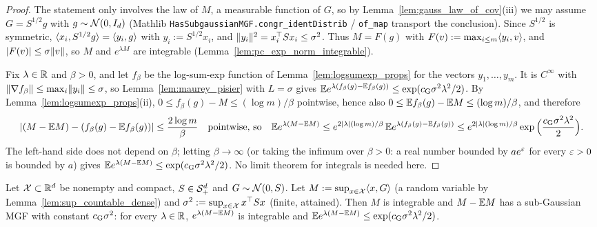 \begin{proof}
\leanok
{}
The statement only involves the law of $M$, a measurable function of $G$, so by
Lemma~\ref{lem:gauss_law_of_cov}(iii) we may assume $G = S^{1/2}g$ with $g \sim \mathcal{N}(0,I_d)$
(Mathlib \texttt{HasSubgaussianMGF.congr\_identDistrib} / \texttt{of\_map} transport the
conclusion). Since $S^{1/2}$ is symmetric, $\langle x_i, S^{1/2}g \rangle = \langle y_i, g \rangle$ with
$y_i := S^{1/2}x_i$, and $\lVert y_i \rVert^2 = x_i^\top Sx_i \le \sigma^2$. Thus $M = F(g)$ with
$F(v) := \max_{i\le m}\langle y_i, v \rangle$, and $\lvert F(v) \rvert \le \sigma\lVert v \rVert$, so $M$ and
$e^{\lambda M}$ are integrable (Lemma~\ref{lem:pc_exp_norm_integrable}).

Fix $\lambda \in \mathbb{R}$ and $\beta > 0$, and let $f_\beta$ be the log-sum-exp function of
Lemma~\ref{lem:logsumexp_props} for the vectors $y_1,\dots,y_m$. It is $C^\infty$ with
$\lVert \nabla f_\beta \rVert \le \max_i\lVert y_i \rVert \le \sigma$, so Lemma~\ref{lem:maurey_pisier} with
$L = \sigma$ gives $\mathbb{E} e^{\lambda(f_\beta(g) - \mathbb{E} f_\beta(g))} \le \exp(c_{\mathrm{G}}\sigma^2\lambda^2/2)$.
By Lemma~\ref{lem:logsumexp_props}(ii), $0 \le f_\beta(g) - M \le (\log m)/\beta$ pointwise,
hence also $0 \le \mathbb{E} f_\beta(g) - \mathbb{E} M \le (\log m)/\beta$, and therefore
\[
  \lvert (M - \mathbb{E} M) - (f_\beta(g) - \mathbb{E} f_\beta(g)) \rvert \le \frac{2\log m}{\beta}
  \quad\text{pointwise, so}\quad
  \mathbb{E} e^{\lambda(M - \mathbb{E} M)} \le e^{2\lvert \lambda \rvert(\log m)/\beta}\,\mathbb{E} e^{\lambda(f_\beta(g) - \mathbb{E} f_\beta(g))}
  \le e^{2\lvert \lambda \rvert(\log m)/\beta}\exp\Big(\frac{c_{\mathrm{G}}\sigma^2\lambda^2}{2}\Big).
\]
The left-hand side does not depend on $\beta$; letting $\beta \to \infty$ (or taking the
infimum over $\beta > 0$: a real number bounded by $a e^{\varepsilon}$ for every $\varepsilon > 0$ is bounded
by $a$) gives $\mathbb{E} e^{\lambda(M-\mathbb{E} M)} \le \exp(c_{\mathrm{G}}\sigma^2\lambda^2/2)$. No limit theorem for
integrals is needed here.
\end{proof}

\begin{lemma}
\label{lem:compact_sup_subgaussian}
\leanok
{}
Let $\mathcal{X} \subset \mathbb{R}^d$ be nonempty and compact, $S \in \mathcal{S}_{+}^{d}$ and $G \sim \mathcal{N}(0,S)$. Let
$M := \sup_{x\in\mathcal{X}}\langle x, G \rangle$ (a random variable by Lemma~\ref{lem:sup_countable_dense})
and $\sigma^2 := \sup_{x\in\mathcal{X}}x^\top Sx$ (finite, attained). Then $M$ is integrable and
$M - \mathbb{E} M$ has a sub-Gaussian MGF with constant $c_{\mathrm{G}}\sigma^2$: for every $\lambda\in\mathbb{R}$,
$e^{\lambda(M-\mathbb{E} M)}$ is integrable and $\mathbb{E} e^{\lambda(M - \mathbb{E} M)} \le \exp(c_{\mathrm{G}}\sigma^2\lambda^2/2)$.
\end{lemma}

